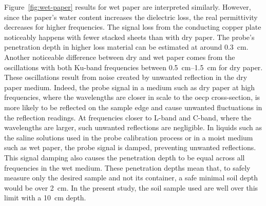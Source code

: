 Figure~\ref{fig:wet-paper} results for wet paper are interpreted similarly.
However, since the paper's water content increases the dielectric loss, the real permittivity decreases for higher frequencies.
The signal loss from the conducting copper plate noticeably happens with fewer stacked sheets than with dry paper.
The probe's penetration depth in higher loss material can be estimated at around \qty{0.3}{\cm}.
Another noticeable difference between dry and wet paper comes from the oscillations with both Ku-band frequencies between \qtyrange{0.5}{1.5}{\cm} for dry paper.
These oscillations result from noise created by unwanted reflection in the dry paper medium.
Indeed, the probe signal in a medium such as dry paper at high frequencies, where the wavelengths are closer in scale to the \ac{oecp} cross-section, is more likely to be reflected on the sample edge and cause unwanted fluctuations in the reflection readings.
At frequencies closer to L-band and C-band, where the wavelengths are larger, such unwanted reflections are negligible.
In liquids such as the saline solutions used in the probe calibration process or in a moist medium such as wet paper, the probe signal is damped, preventing unwanted reflections.
This signal damping also causes the penetration depth to be equal across all frequencies in the wet medium. 
These penetration depths mean that, to safely measure only the desired sample and not its container, a safe minimal soil depth would be over \qty{2}{\cm}.
In the present study, the soil sample used are well over this limit with a \qty{10}{\cm} depth.



